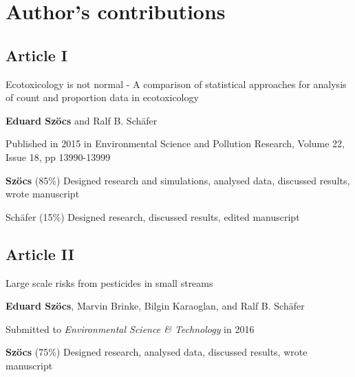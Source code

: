 

\chapter{Author's contributions}



\begin{sloppypar}

\section*{Article I}
\vspace{-1em}
\small
\begin{description}
    \setlength\itemsep{0em}
	\item[Title:] Ecotoxicology is not normal - A comparison of statistical approaches for analysis of count and proportion data in ecotoxicology
	\item[Authors:] \textbf{Eduard Szöcs} and Ralf B. Schäfer
	\item[Status:] Published in 2015 in Environmental Science and Pollution Research, Volume 22, Issue 18, pp 13990-13999
	\item[Contributions:] \textbf{Szöcs} (85\%) Designed research and simulations, analysed data, discussed results, wrote manuscript 

	Schäfer (15\%) Designed research, discussed results, edited manuscript
\end{description}
\normalsize
\vfill

\section*{Article II}
\vspace{-1em}
\small
\begin{description}
    \setlength\itemsep{0em}
	\item[Title:] Large scale risks from pesticides in small streams
	\item[Authors:] \textbf{Eduard Szöcs}, Marvin Brinke, Bilgin Karaoglan, and Ralf B. Schäfer
	\item[Status:] Submitted to \emph{Environmental Science \& Technology} in 2016
	\item[Contributions:] \textbf{Szöcs} (75\%) Designed research, analysed data, discussed results, wrote manuscript


\end{description}
\end{sloppypar}
